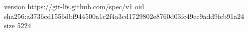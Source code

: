 version https://git-lfs.github.com/spec/v1
oid sha256:a3736cd1556dbf944500a1c2f4a3cd1729802e8760d03fc49cc9add9fcb91a24
size 5224
